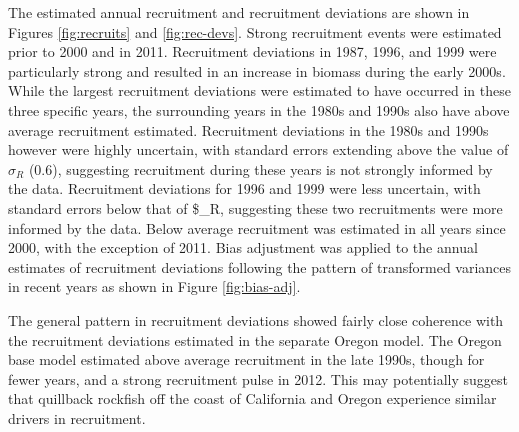 \documentclass[11pt,
  english,
  a4paper,
]{article}
\begin{document}
\leavevmode\tagmcend\tagstructend\par


The estimated annual recruitment and recruitment deviations are shown in Figures \ref{fig:recruits} and \ref{fig:rec-devs}. Strong recruitment events were estimated prior to 2000 and in 2011. Recruitment deviations in 1987, 1996, and 1999 were particularly strong and resulted in an increase in biomass during the early 2000s. While the largest recruitment deviations were estimated to have occurred in these three specific years, the surrounding years in the 1980s and 1990s also have above average recruitment estimated. Recruitment deviations in the 1980s and 1990s however were highly uncertain, with standard errors extending above the value of {\(\sigma_R\)\leavevmode\tagmcend\tagstructend} (0.6), suggesting recruitment during these years is not strongly informed by the data. Recruitment deviations for 1996 and 1999 were less uncertain, with standard errors below that of \$\sigma\_R, suggesting these two recruitments were more informed by the data. Below average recruitment was estimated in all years since 2000, with the exception of 2011. Bias adjustment was applied to the annual estimates of recruitment deviations following the pattern of transformed variances in recent years as shown in Figure \ref{fig:bias-adj}.

\leavevmode\tagmcend\tagstructend\par


The general pattern in recruitment deviations showed fairly close coherence with the recruitment deviations estimated in the separate Oregon model. The Oregon base model estimated above average recruitment in the late 1990s, though for fewer years, and a strong recruitment pulse in 2012. This may potentially suggest that quillback rockfish off the coast of California and Oregon experience similar drivers in recruitment.

\leavevmode\tagmcend\tagstructend\par

\end{document}
